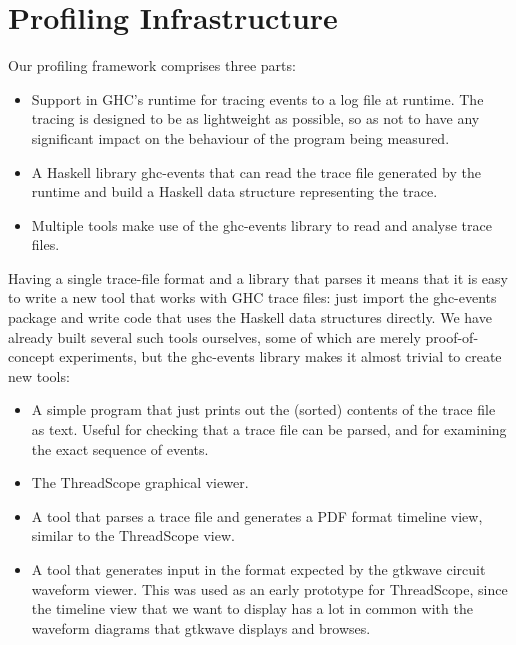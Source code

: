 \documentclass[twocolumn,9pt]{sigplanconf}
\newcommand{\codef}[1]{{\fontfamily{cmss}\small#1}}
\begin{document}


\section{Profiling Infrastructure}
Our profiling framework comprises three parts:

\begin{itemize}
\item Support in GHC's runtime for tracing events to a log file at
  runtime.  The tracing is designed to be as lightweight as possible,
  so as not to have any significant impact on the behaviour of the
  program being measured.

\item A Haskell library \codef{ghc-events} that can read the trace file
  generated by the runtime and build a Haskell data structure
  representing the trace.

\item Multiple tools make use of the \codef{ghc-events} library to read and
  analyse trace files.
\end{itemize}

Having a single trace-file format and a library that parses it means
that it is easy to write a new tool that works with GHC trace files:
just import the \codef{ghc-events} package and write code that uses the
Haskell data structures directly.  We have already built several such
tools ourselves, some of which are merely proof-of-concept
experiments, but the \codef{ghc-events} library makes it almost trivial to
create new tools:

\begin{itemize}
\item A simple program that just prints out the (sorted) contents of
  the trace file as text.  Useful for checking that a trace file can
  be parsed, and for examining the exact sequence of events.

\item The ThreadScope graphical viewer.

\item A tool that parses a trace file and generates a PDF format
  timeline view, similar to the ThreadScope view.

\item A tool that generates input in the format expected by the
  gtkwave circuit waveform viewer.  This was used as an early
  prototype for ThreadScope, since the timeline view that we want to
  display has a lot in common with the waveform diagrams that gtkwave
  displays and browses.
\end{itemize}
\end{document}

